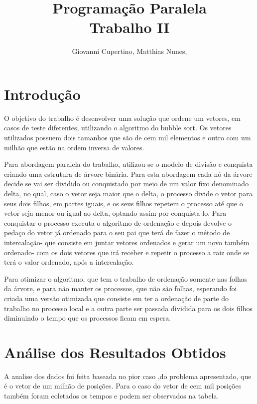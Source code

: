 \documentclass[9pt]{IEEEtran}
\title{Programação Paralela\\ Trabalho II}
\author{Giovanni Cupertino, Matthias Nunes, \IEEEmembership{Usuário pp12820}}
\begin{document}
\maketitle

\section{Introdução}

O objetivo do trabalho é desenvolver uma solução que ordene um vetores, em casos
de teste diferentes, utilizando o algoritmo do bubble sort. Os vetores
utilizados possuem dois tamanhos que são de cem mil elementos e outro com um
milhão que estão na ordem inversa de valores.

Para abordagem paralela do trabalho, utilizou-se o modelo de divisão e conquista
criando uma estrutura de árvore binária. Para esta abordagem cada nó da árvore
decide se vai ser dividido ou conquistado por meio de um valor fixo denominado
delta, no qual, caso o vetor seja maior que o delta, o processo divide o vetor
para seus dois filhos, em partes iguais, e os seus filhos repetem o processo até
que o vetor seja menor ou igual ao delta, optando assim por conquista-lo. Para
conquistar o processo executa o algoritmo de ordenação e depois devolve o pedaço
do vetor já ordenado para o seu pai que terá de fazer o método de intercalação-
que consiste em juntar vetores ordenados e gerar um novo também ordenado- com os
dois vetores que irá receber e repetir o processo a raiz onde se terá o valor
ordenado, após a intercalação.

Para otimizar o algoritmo, que tem o trabalho de ordenação somente nas folhas da
árvore, e para não manter os processos, que não são folhas, esperando foi criada
uma versão otimizada que consiste em ter a ordenação de parte do trabalho no
processo local e a outra parte ser passada dividida para os dois filhos
diminuindo o tempo que os processos ficam em espera.

\section{Análise dos Resultados Obtidos}

A analise dos dados foi feita baseada no pior caso ,do problema apresentado, que
é o vetor de um milhão de posições. Para o caso do vetor de cem mil posições
também foram coletados os tempos e podem ser observados na tabela.
\end{document}
